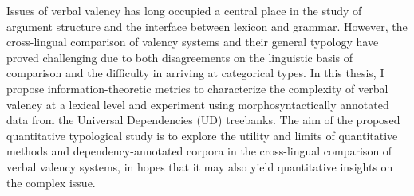 Issues of verbal valency has long occupied a central place in the study of argument structure and the interface between lexicon and grammar. However, the cross-lingual comparison of valency systems and their general typology have proved challenging due to both disagreements on the linguistic basis of comparison and the difficulty in arriving at categorical types. In this thesis, I propose information-theoretic metrics to characterize the complexity of verbal valency at a lexical level and experiment using morphosyntactically annotated data from the Universal Dependencies (UD) treebanks. The aim of the proposed quantitative typological study is to explore the utility and limits of quantitative methods and dependency-annotated corpora in the cross-lingual comparison of verbal valency systems, in hopes that it may also yield quantitative insights on the complex issue.